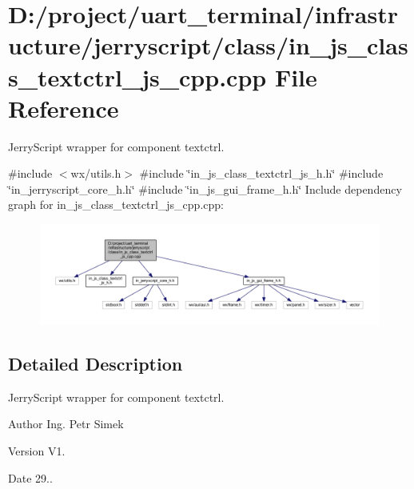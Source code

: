 \section{D\+:/project/uart\+\_\+terminal/infrastructure/jerryscript/class/in\+\_\+js\+\_\+class\+\_\+textctrl\+\_\+js\+\_\+cpp.cpp File Reference}
\label{in__js__class__textctrl__js__cpp_8cpp}


Jerry\+Script wrapper for component textctrl.  


{\ttfamily \#include $<$wx/utils.\+h$>$}\newline
{\ttfamily \#include \char`\"{}in\+\_\+js\+\_\+class\+\_\+textctrl\+\_\+js\+\_\+h.\+h\char`\"{}}\newline
{\ttfamily \#include \char`\"{}in\+\_\+jerryscript\+\_\+core\+\_\+h.\+h\char`\"{}}\newline
{\ttfamily \#include \char`\"{}in\+\_\+js\+\_\+gui\+\_\+frame\+\_\+h.\+h\char`\"{}}\newline
Include dependency graph for in\+\_\+js\+\_\+class\+\_\+textctrl\+\_\+js\+\_\+cpp.\+cpp\+:\nopagebreak
\begin{figure}[H]
\begin{center}
\leavevmode
\includegraphics[width=350pt]{in__js__class__textctrl__js__cpp_8cpp__incl}
\end{center}
\end{figure}


\subsection{Detailed Description}
Jerry\+Script wrapper for component textctrl. 

\begin{DoxyAuthor}{Author}
Ing. Petr Simek 
\end{DoxyAuthor}
\begin{DoxyVersion}{Version}
V1. 
\end{DoxyVersion}
\begin{DoxyDate}{Date}
29.. 
\end{DoxyDate}
